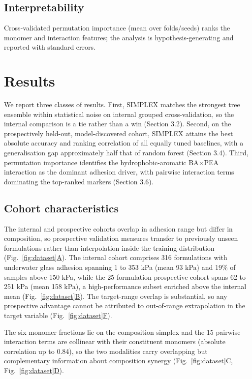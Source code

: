 \documentclass[utf8]{FrontiersinHarvard}
\newcommand{\Fref}[2]{Fig.~\hyperref[#1]{\ref{#1}#2}}
\begin{document}
\subsection{Interpretability}
Cross-validated permutation importance (mean over folds/seeds) ranks the monomer and interaction features; the analysis is hypothesis-generating and reported with standard errors.

\section{Results}

We report three classes of results. First, SIMPLEX matches the strongest tree ensemble within statistical noise on internal grouped cross-validation, so the internal comparison is a tie rather than a win (Section 3.2). Second, on the prospectively held-out, model-discovered cohort, SIMPLEX attains the best absolute accuracy and ranking correlation of all equally tuned baselines, with a generalisation gap approximately half that of random forest (Section 3.4). Third, permutation importance identifies the hydrophobic-aromatic BA$\times$PEA interaction as the dominant adhesion driver, with pairwise interaction terms dominating the top-ranked markers (Section 3.6).

\subsection{Cohort characteristics}

The internal and prospective cohorts overlap in adhesion range but differ in composition, so prospective validation measures transfer to previously unseen formulations rather than interpolation inside the training distribution (\Fref{fig:dataset}{A}). The internal cohort comprises 316 formulations with underwater glass adhesion spanning 1 to 353 kPa (mean 93 kPa) and 19\% of samples above 150 kPa, while the 25-formulation prospective cohort spans 62 to 251 kPa (mean 158 kPa), a high-performance subset enriched above the internal mean (\Fref{fig:dataset}{B}). The target-range overlap is substantial, so any prospective advantage cannot be attributed to out-of-range extrapolation in the target variable (\Fref{fig:dataset}{F}).

The six monomer fractions lie on the composition simplex and the 15 pairwise interaction terms are collinear with their constituent monomers (absolute correlation up to 0.84), so the two modalities carry overlapping but complementary information about composition synergy (\Fref{fig:dataset}{C}, \Fref{fig:dataset}{D}).
\end{document}
